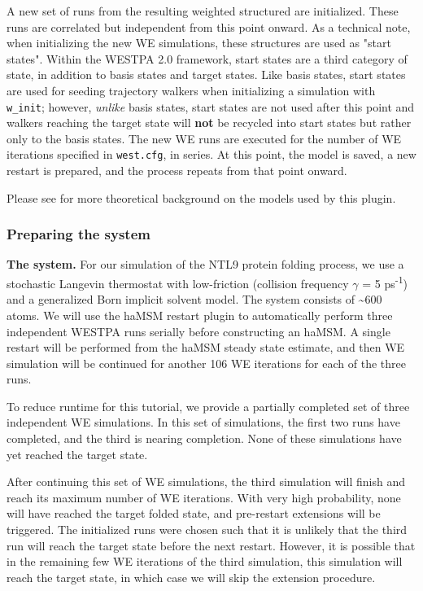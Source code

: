 A new set of runs from the resulting weighted structured are initialized. 
These runs are correlated but independent from this point onward.
As a technical note, when initializing the new WE simulations, these structures are used as "start states". 
Within the WESTPA 2.0 framework, start states are a third category of state, in addition to basis states and target states. 
Like basis states, start states are used for seeding trajectory walkers when initializing a simulation with \verb|w_init|; however, \textit{unlike} basis states, start states are not used after this point and walkers reaching the target state will \textbf{not} be recycled into start states but rather only to the basis states. 
The new WE runs are executed for the number of WE iterations specified in \verb|west.cfg|, in series. 
At this point, the model is saved, a new restart is prepared, and the process repeats from that point onward.

Please see \citep{russo_westpa_2022, copperman_accelerated_2020} for more theoretical background on the models used by this plugin.

\subsubsection{Preparing the system}

\noindent\textbf{The system.} For our simulation of the NTL9 protein folding process, we use a stochastic Langevin thermostat with low-friction (collision frequency $\gamma$ = 5 ps\textsuperscript{-1}) and a generalized Born implicit solvent model. 
The system consists of \textasciitilde600 atoms. 
We will use the haMSM restart plugin to automatically perform three independent WESTPA runs serially before constructing an haMSM. 
A single restart will be performed from the haMSM steady state estimate, and then WE simulation will be continued for another 106 WE iterations for each of the three runs.

To reduce runtime for this tutorial, we provide a partially completed set of three independent WE simulations. 
In this set of simulations, the first two runs have completed, and the third is nearing completion. 
None of these simulations have yet reached the target state. 

After continuing this set of WE simulations, the third simulation will finish and reach its maximum number of WE iterations. 
With very high probability, none will have reached the target folded state, and pre-restart extensions will be triggered. 
The initialized runs were chosen such that it is unlikely that the third run will reach the target state before the next restart. 
However, it is possible that in the remaining few WE iterations of the third simulation, this simulation will reach the target state, in which case we will skip the extension procedure.


